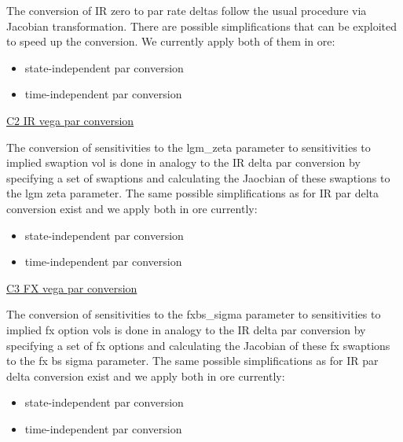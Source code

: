 The conversion of IR zero to par rate deltas follow the usual procedure via Jacobian transformation. There are possible simplifications that can be exploited to speed up the conversion. We currently apply both of them in ore:

\begin{itemize}
\item state-independent par conversion
\item time-independent par conversion
\end{itemize}

\underline{C2 IR vega par conversion}

The conversion of sensitivities to the lgm\_zeta parameter to sensitivities to implied swaption vol is done in analogy
to the IR delta par conversion by specifying a set of swaptions and calculating the Jaocbian of these swaptions to the
lgm zeta parameter. The same possible simplifications as for IR par delta conversion exist and we apply both in ore
currently:

\begin{itemize}
\item state-independent par conversion
\item time-independent par conversion
\end{itemize}

\underline{C3 FX vega par conversion}

The conversion of sensitivities to the fxbs\_sigma parameter to sensitivities to implied fx option vols is done in
analogy to the IR delta par conversion by specifying a set of fx options and calculating the Jacobian of these fx
swaptions to the fx bs sigma parameter. The same possible simplifications as for IR par delta conversion exist and we
apply both in ore currently:

\begin{itemize}
\item state-independent par conversion
\item time-independent par conversion
\end{itemize}
